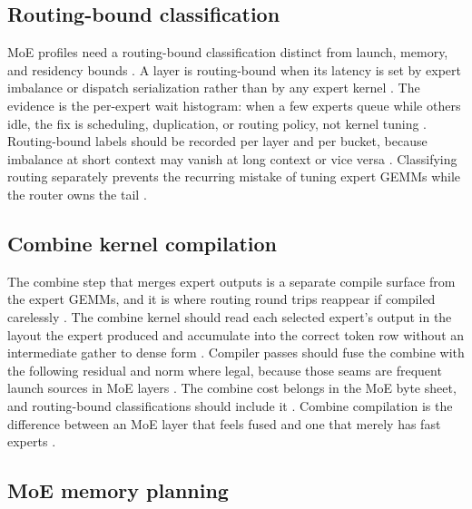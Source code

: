 \subsection{Routing-bound classification}

MoE profiles need a routing-bound classification distinct from launch, memory, and residency bounds \citep{liu2024deepseekv3,patel2025llminference,taxbreak2026}. A layer is routing-bound when its latency is set by expert imbalance or dispatch serialization rather than by any expert kernel \citep{memoryfloor2026,chen2020compilerbasedhardw}. The evidence is the per-expert wait histogram: when a few experts queue while others idle, the fix is scheduling, duplication, or routing policy, not kernel tuning \citep{patel2025llminference,liu2024deepseekv3}. Routing-bound labels should be recorded per layer and per bucket, because imbalance at short context may vanish at long context or vice versa \citep{memoryfloor2026,taxbreak2026}. Classifying routing separately prevents the recurring mistake of tuning expert GEMMs while the router owns the tail \citep{patel2025llminference,memoryfloor2026}.

\subsection{Combine kernel compilation}

The combine step that merges expert outputs is a separate compile surface from the expert GEMMs, and it is where routing round trips reappear if compiled carelessly \citep{liu2024deepseekv3,patel2025llminference,memoryfloor2026}. The combine kernel should read each selected expert's output in the layout the expert produced and accumulate into the correct token row without an intermediate gather to dense form \citep{chen2020compilerbasedhardw,taxbreak2026}. Compiler passes should fuse the combine with the following residual and norm where legal, because those seams are frequent launch sources in MoE layers \citep{memoryfloor2026,patel2025llminference}. The combine cost belongs in the MoE byte sheet, and routing-bound classifications should include it \citep{liu2024deepseekv3,taxbreak2026}. Combine compilation is the difference between an MoE layer that feels fused and one that merely has fast experts \citep{chen2020compilerbasedhardw,memoryfloor2026}.

\subsection{MoE memory planning}

